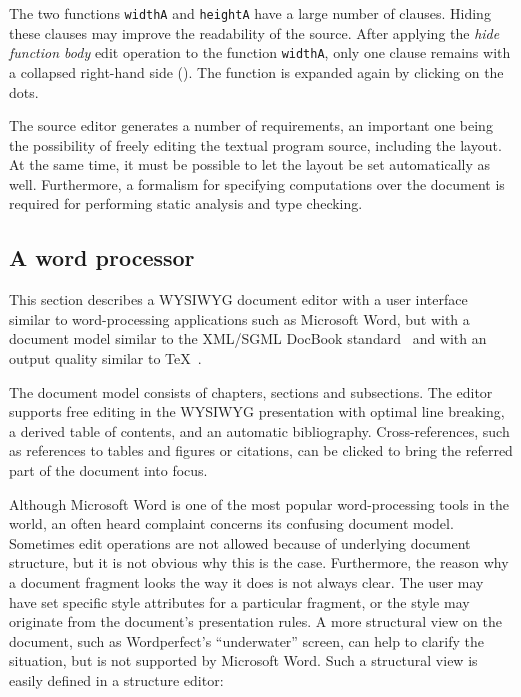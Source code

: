 The two functions \verb|widthA| and \verb|heightA| have a large number of clauses. Hiding these clauses may improve the readability of the source. After applying the {\em hide function body} edit operation to the function \verb|widthA|,  only one clause remains with a collapsed right-hand side ({\tt \frame{\rule{0cm}{1.5ex}\dots}}). The function is expanded again by clicking on the dots. 



The source editor generates a number of requirements, an important one being the possibility of freely editing the textual program source, including the layout. At the same time, it must be possible to let the layout be set automatically as well. Furthermore, a formalism for specifying computations over the document is required for performing static analysis and type checking.


%																
\subsection{A word processor} \label{sect:wordprocessor} This section describes a WYSIWYG document editor with a user interface similar to word-processing applications such as Microsoft Word, but with a document model similar to the XML/SGML DocBook standard~\cite{walsh02docbook} and with an output quality similar to \TeX~\cite{knuth84tex}.


The document model consists of chapters, sections and subsections. The editor supports free editing in the WYSIWYG presentation with optimal line breaking, a derived table of contents, and an automatic bibliography. Cross-references, such as references to tables and figures or citations, can be clicked to bring the referred part of the document into focus.


Although Microsoft Word is one of the most popular word-processing tools in the world, an often heard complaint concerns its confusing document model. Sometimes edit operations are not allowed because of underlying document structure, but it is not obvious why this is the case. Furthermore, the reason why a document fragment looks the way it does is not always clear. The user may have set specific style attributes for a particular fragment, or the style may originate from the document's presentation rules. A more structural view on the document, such as Wordperfect's ``underwater'' screen, can help to clarify the situation, but is not supported by Microsoft Word. Such a structural view is easily defined in a structure editor:

